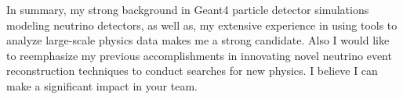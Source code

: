 \documentclass[11pt]{article} %
\begin{document}

In summary, my strong background in Geant4 particle detector simulations
modeling neutrino detectors, as well as, my extensive experience in using tools
to analyze large-scale physics data makes me a strong candidate. Also I would
like to reemphasize my previous accomplishments in innovating novel neutrino
event reconstruction techniques to conduct searches for new physics. I believe
I can make a significant impact in your team.
\end{document}
